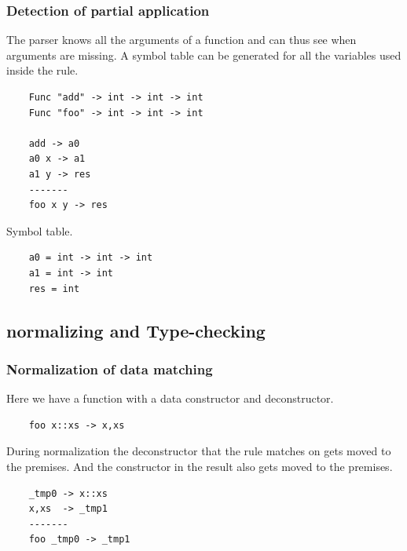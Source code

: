\begin{frame}[fragile]
    \frametitle{Detection of partial application}   
    The parser knows all the arguments of a function and can thus see when arguments are missing.
    A symbol table can be generated for all the variables used inside the rule.

    \begin{lstlisting}
    Func "add" -> int -> int -> int
    Func "foo" -> int -> int -> int
    
    add -> a0
    a0 x -> a1
    a1 y -> res
    -------
    foo x y -> res
    \end{lstlisting}

    Symbol table.
    \begin{lstlisting}
    a0 = int -> int -> int
    a1 = int -> int
    res = int
    \end{lstlisting}
\end{frame}

\subsection{normalizing and Type-checking}



\begin{frame}[fragile]
    \frametitle{Normalization of data matching}
    Here we have a function with a data constructor and deconstructor.
    \begin{lstlisting}
    foo x::xs -> x,xs
    \end{lstlisting}
    During normalization the deconstructor that the rule matches on gets moved to the premises.
    And the constructor in the result also gets moved to the premises.
    \begin{lstlisting}
    _tmp0 -> x::xs
    x,xs  -> _tmp1
    -------
    foo _tmp0 -> _tmp1
    \end{lstlisting}
\end{frame}

